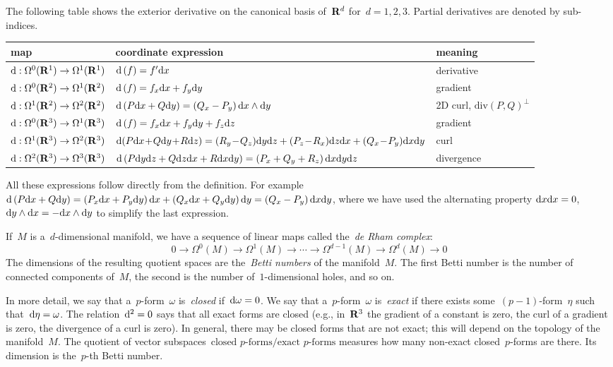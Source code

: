 The following table shows the exterior derivative on the canonical basis
of~$\mathbf{R}^d$ for~$d=1,2,3$.  Partial derivatives are denoted by sub-indices.

\begin{tabular}{l|l|l}
	map & coordinate expression & meaning \\
	\hline
	$\mathrm{d}:\Omega^0(\mathbf{R}^1)\to\Omega^1(\mathbf{R}^1)$ &
	$\mathrm{d}\left(f\right) = f'\mathrm{d} x$ &
	derivative\\
	\hline
	$\mathrm{d}:\Omega^0(\mathbf{R}^2)\to\Omega^1(\mathbf{R}^2)$ &
	$\mathrm{d}\left(f\right) = f_x\mathrm{d} x + f_y\mathrm{d} y$ &
	gradient \\
	$\mathrm{d}:\Omega^1(\mathbf{R}^2)\to\Omega^2(\mathbf{R}^2)$ &
	$\mathrm{d}\left(P\mathrm{d} x+Q\mathrm{d} y\right) = \left(Q_x-P_y\right)\mathrm{d} x\wedge\mathrm{d} y$ &
	2D curl, $\mathrm{div}(P,Q)^\perp$ \\
	\hline
	$\mathrm{d}:\Omega^0(\mathbf{R}^3)\to\Omega^1(\mathbf{R}^3)$ &
	$\mathrm{d}\left(f\right) = f_x\mathrm{d} x + f_y\mathrm{d} y + f_z\mathrm{d} z$ &
	gradient \\
	$\mathrm{d}:\Omega^1(\mathbf{R}^3)\to\Omega^2(\mathbf{R}^3)$ &
	\footnotesize
	$\ud\!\left(P\ud x\!+\!Q\ud y\!+\!R\ud z\right) =
	\left(R_y\!-\!Q_z\right)\!\ud y\ud z
	+
	\left(P_z\!-\!R_x\right)\!\ud z\ud x
	+
	\left(Q_x\!-\!P_y\right)\!\ud x\ud y$
	&
	curl \\
	$\mathrm{d}:\Omega^2(\mathbf{R}^3)\to\Omega^3(\mathbf{R}^3)$ &
	$\mathrm{d}\left(P\mathrm{d} y\mathrm{d} z+Q\mathrm{d} z\mathrm{d} x+R\mathrm{d} x\mathrm{d} y\right)
	=\left(P_x+Q_y+R_z\right)\mathrm{d} x\mathrm{d} y\mathrm{d} z$
	&
	divergence
\end{tabular}

All these expressions follow directly from the definition.  For
example~$\mathrm{d}\left(P\mathrm{d} x+Q\mathrm{d} y\right)=
\left(P_x\mathrm{d} x+P_y\mathrm{d} y\right)\mathrm{d} x+\left(Q_x\mathrm{d} x+Q_y\mathrm{d} y\right)\mathrm{d} y
=\left(Q_x-P_y\right)\mathrm{d} x\mathrm{d} y$, where we have used the alternating
property
$\mathrm{d} x\mathrm{d} x=0$,~$\mathrm{d} y\wedge\mathrm{d} x=-\mathrm{d} x\wedge\mathrm{d} y$ to simplify the last
expression.

If~$M$ is a~$d$-dimensional manifold, we have a sequence of linear maps
called the~\emph{de Rham complex}:
\[
	0
	\to
	\Omega^0(M)
	\to
	\Omega^1(M)
	\to\cdots\to
	\Omega^{d-1}(M)
	\to
	\Omega^d(M)
	\to
	0
\]
The dimensions of the resulting quotient spaces are the~\emph{Betti numbers}
of the manifold~$M$.  The first Betti number is the number of connected
components of~$M$, the second is the number of~$1$-dimensional holes, and so
on.

In more detail, we say that a~$p$-form~$\omega$ is~\emph{closed}
if~$\mathrm{d}\omega=0$.  We say that a~$p$-form~$\omega$ is~\emph{exact} if there
exists some~$(p-1)$-form~$\eta$ such that~$\mathrm{d}\eta=\omega$.  The
relation~$\mathrm{d}^2=0$ says that all exact forms are closed (e.g., in~$\mathbf{R}^3$ the
gradient of a constant is zero, the curl of a gradient is zero, the
divergence of a curl is zero).  In general, there may be closed forms that
are not exact; this will depend on the topology of the manifold~$M$.  The quotient of vector
subspaces~$\textrm{closed $p$-forms}/\textrm{exact $p$-forms}$ measures how
many non-exact closed~$p$-forms are there.  Its dimension is the~$p$-th Betti
number.

